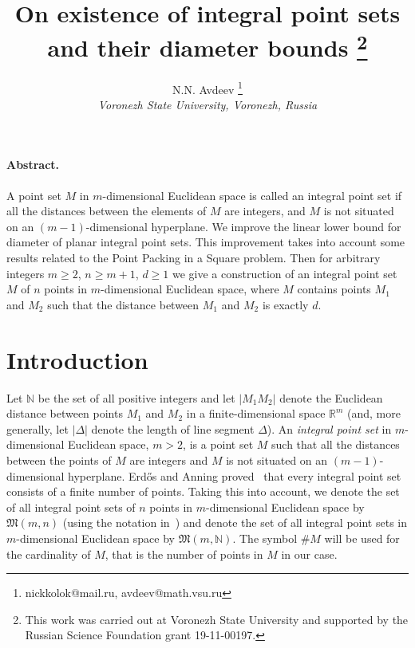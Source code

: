 \documentclass[a4paper,14pt]{article} %
\theoremstyle{plain}
\theoremstyle{definition}
\begin{document}

\title{
	On existence of integral point sets and their diameter bounds
	\footnote{
		This work was carried out at Voronezh State University and supported by the Russian Science
		Foundation grant 19-11-00197.
	}
}

\author{
	N.N. Avdeev
	\footnote{nickkolok@mail.ru, avdeev@math.vsu.ru}
	\\
	\textit{Voronezh State University, Voronezh, Russia}
}


\maketitle

\paragraph{Abstract.}
A point set $M$ in $m$-dimensional Euclidean space is called an integral point set if all the distances between the
elements of $M$ are integers, and $M$ is not situated on an $(m-1)$-dimensional hyperplane.
We improve the linear lower bound for diameter of planar integral point sets.
This improvement takes into account some results related to the Point Packing in a Square problem.
Then for arbitrary integers $m \geq 2$, $n \geq m+1$, $d \geq 1$
we give a construction of an integral point set $M$ of $n$ points in $m$-dimensional Euclidean space,
where $M$ contains points $M_1$ and $M_2$ such that the distance between $M_1$ and $M_2$ is exactly $d$.



\section{Introduction}
Let $\mathbb{N}$ be the set of all positive integers and let $|M_1 M_2|$ denote the Euclidean distance
between points $M_1$ and $M_2$ in a finite-dimensional space $\mathbb{R}^m$
(and, more generally, let $|\Delta|$ denote the length of line segment $\Delta$).
An \textit{integral point set} in $m$-dimensional Euclidean space, $m>2$, is a point set $M$ such that all the distances between the
points of $M$ are integers and $M$ is not situated on an $(m-1)$-dimensional hyperplane.
Erd{\H{o}}s and Anning proved~\cite{anning1945integral,erdos1945integral} that every integral point set consists of a finite number of points.
Taking this into account, we denote the set of all integral point sets of $n$ points in $m$-dimensional Euclidean space by
$\mathfrak{M}(m,n)$ (using the notation in~\cite{our-vmmsh-2018-translit})
and denote the set of all integral point sets in $m$-dimensional Euclidean space by $\mathfrak{M}(m,\mathbb{N})$.
The symbol $\# M$ will be used for the cardinality of $M$, that is the number of points in $M$ in our case.
\end{document}
